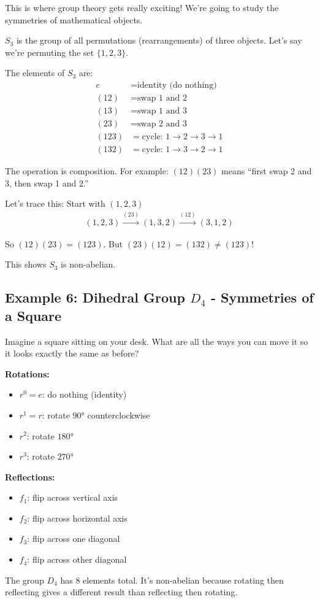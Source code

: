 \documentclass[12pt]{article}
\begin{document}
This is where group theory gets really exciting! We're going to study the symmetries of mathematical objects.

\begin{examplebox}
$S_3$ is the group of all permutations (rearrangements) of three objects. Let's say we're permuting the set $\{1, 2, 3\}$.

The elements of $S_3$ are:
\begin{align}
e &= \text{identity (do nothing)} \\
(12) &= \text{swap 1 and 2} \\
(13) &= \text{swap 1 and 3} \\
(23) &= \text{swap 2 and 3} \\
(123) &= \text{cycle: } 1 \to 2 \to 3 \to 1 \\
(132) &= \text{cycle: } 1 \to 3 \to 2 \to 1
\end{align}

The operation is composition. For example:
$(12)(23)$ means ``first swap 2 and 3, then swap 1 and 2.''

Let's trace this: Start with $(1,2,3)$
\begin{align}
(1,2,3) \xrightarrow{(23)} (1,3,2) \xrightarrow{(12)} (3,1,2)
\end{align}

So $(12)(23) = (123)$. But $(23)(12) = (132) \neq (123)$!

This shows $S_3$ is non-abelian.
\end{examplebox}

\subsection{\textcolor{HeaderColor}{Example 6: Dihedral Group $D_4$ - Symmetries of a Square}}

\begin{examplebox}
Imagine a square sitting on your desk. What are all the ways you can move it so it looks exactly the same as before?

\textbf{Rotations:}
\begin{itemize}
\item $r^0 = e$: do nothing (identity)
\item $r^1 = r$: rotate $90°$ counterclockwise  
\item $r^2$: rotate $180°$
\item $r^3$: rotate $270°$ 
\end{itemize}

\textbf{Reflections:}
\begin{itemize}
\item $f_1$: flip across vertical axis
\item $f_2$: flip across horizontal axis  
\item $f_3$: flip across one diagonal
\item $f_4$: flip across other diagonal
\end{itemize}

The group $D_4$ has 8 elements total. It's non-abelian because rotating then reflecting gives a different result than reflecting then rotating.
\end{examplebox}
\end{document}
